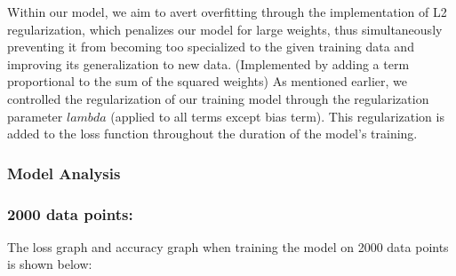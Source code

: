 \documentclass{article}
\begin{document}
Within our model, we aim to avert overfitting through the implementation of L2 regularization, which penalizes our model for large weights, thus simultaneously preventing it from becoming too specialized to the given training data and improving its generalization to new data. (Implemented by adding a term proportional to the sum of the squared weights) As mentioned earlier, we controlled the regularization of our training model through the regularization parameter $lambda$ (applied to all terms except bias term). This regularization is added to the loss function throughout the duration of the model's training.

\subsubsection*{Model Analysis}
\subsubsection*{2000 data points:}
The loss graph and accuracy graph when training the model on 2000 data points is shown below:
\end{document}
